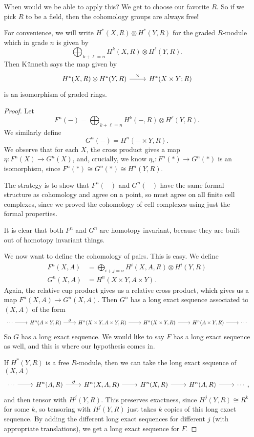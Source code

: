 \documentclass[a4paper]{article}
\begin{document}
When would we be able to apply this? We get to choose our favorite $R$. So if we pick $R$ to be a field, then the cohomology groups are always free!

For convenience, we will write $H^*(X, R) \otimes H^*(Y, R)$ for the graded $R$-module which in grade $n$ is given by
\[
  \bigoplus_{k + \ell = n} H^k(X, R) \otimes H^\ell (Y, R).
\]
Then K\"unneth says the map given by
\[
  \begin{tikzcd}
    H^*(X, R) \otimes H^*(Y, R) \ar[r, "\times"] & H^*(X \times Y; R)
  \end{tikzcd}
\]
is an isomorphism of graded rings.

\begin{proof}
  Let
  \[
    F^n(-) = \bigoplus_{k + \ell = n} H^k(-, R) \otimes H^\ell(Y, R).
  \]
  We similarly define
  \[
    G^n(-) = H^n(-\times Y, R).
  \]
  We observe that for each $X$, the cross product gives a map $\eta: F^n(X) \to G^n(X)$, and, crucially, we know $\eta_*: F^n(*) \to G^n(*)$ is an isomorphism, since $F^n(*) \cong G^n(*) \cong H^n(Y, R)$.

  The strategy is to show that $F^n(-)$ and $G^n(-)$ have the same formal structure as cohomology and agree on a point, so must agree on all finite cell complexes, since we proved the cohomology of cell complexes using just the formal properties.

  It is clear that both $F^n$ and $G^n$ are homotopy invariant, because they are built out of homotopy invariant things.

  We now want to define the cohomology of pairs. This is easy. We define
  \begin{align*}
    F^n(X, A) &= \bigoplus_{i + j = n} H^i(X, A, R) \otimes H^i(Y, R)\\
    G^n(X, A) &= H^n(X \times Y, A \times Y).
  \end{align*}
  Again, the relative cup product gives us a relative cross product, which gives us a map $F^n(X, A) \to G^n(X, A)$. Then $G^n$ has a long exact sequence associated to $(X, A)$ of the form
  \[
    \begin{tikzcd}
      \cdots \ar[r] & H^n(A \times Y, R) \ar[r, "\partial"] & H^n(X \times Y, A \times Y, R) \ar[r] & H^n(X \times Y, R) \ar[r] & H^n(A \times Y, R) \ar[r] & \cdots
    \end{tikzcd}
  \]
  So $G$ has a long exact sequence. We would like to say $F$ has a long exact sequence as well, and this is where our hypothesis comes in.

  If $H^*(Y, R)$ is a free $R$-module, then we can take the long exact sequence of $(X, A)$
  \[
    \begin{tikzcd}
      \cdots \ar[r] & H^n(A, R) \ar[r, "\partial"] & H^n(X , A , R) \ar[r] & H^n(X , R) \ar[r] & H^n(A , R) \ar[r] & \cdots
    \end{tikzcd},
  \]
  and then tensor with $H^j(Y, R)$. This preserves exactness, since $H^j(Y, R) \cong R^k$ for some $k$, so tensoring with $H^j(Y, R)$ just takes $k$ copies of this long exact sequence. By adding the different long exact sequences for different $j$ (with appropriate translations), we get a long exact sequence for $F$.


\end{proof}
\end{document}
